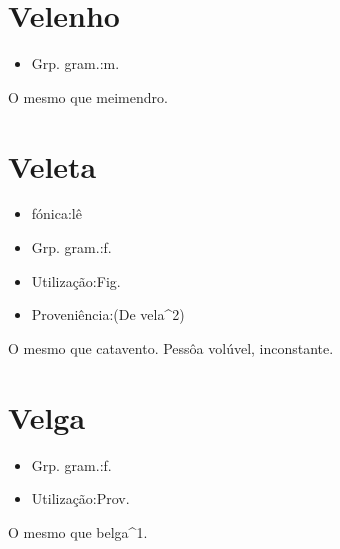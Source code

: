 \documentclass{article}
\begin{document}
\section{Velenho}
\begin{itemize}
\item {Grp. gram.:m.}
\end{itemize}
O mesmo que \textunderscore meimendro\textunderscore .
\section{Veleta}
\begin{itemize}
\item {fónica:lê}
\end{itemize}
\begin{itemize}
\item {Grp. gram.:f.}
\end{itemize}
\begin{itemize}
\item {Utilização:Fig.}
\end{itemize}
\begin{itemize}
\item {Proveniência:(De \textunderscore vela\textunderscore ^2)}
\end{itemize}
O mesmo que \textunderscore catavento\textunderscore .
Pessôa volúvel, inconstante.
\section{Velga}
\begin{itemize}
\item {Grp. gram.:f.}
\end{itemize}
\begin{itemize}
\item {Utilização:Prov.}
\end{itemize}
O mesmo que \textunderscore belga\textunderscore ^1.
\end{document}

